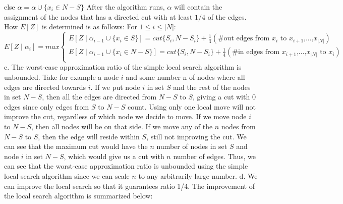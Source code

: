 \documentclass[oneside]{homework} %
\begin{document}
\quad \quad else $\alpha = \alpha \cup \{x_i \in N-S\}$ \newline
\newline
After the algorithm runs, $\alpha$ will contain the assignment of the nodes that has a directed cut with at least $1/4$ of the edges. How $E[Z]$ is determined is as follows: \newline
For $1 \leq i \leq |N|$:
\begin{equation*}
  E[Z \mid \alpha_i] = max
  \begin{cases}
    E[Z \mid \alpha_{i-1} \cup \{x_i \in S\}] = cut\{S_i, N-S_i\} + \frac{1}{4}(\#\text{out edges from $x_i$ to $x_{i+1}$,...,$x_{|N|}$}) \\
    E[Z \mid \alpha_{i-1} \cup \{x_i \in N-S\}] = cut\{S_i, N-S_i\} + \frac{1}{4}(\#\text{in edges from $x_{i+1}$,...,$x_{|N|}$ to $x_i$})\\
  \end{cases}
\end{equation*}
\newline
\newline
{\large c.} The worst-case approximation ratio of the simple local search algorithm is unbounded. Take for example a node $i$ and some number n of nodes where all edges are directed towards $i$. If we put node $i$ in set $S$ and the rest of the nodes in set $N-S$, then all the edges are directed from $N-S$ to $S$, giving a cut with 0 edges since only edges from $S$ to $N-S$ count. Using only one local move will not improve the cut, regardless of which node we decide to move. If we move node $i$ to $N-S$, then all nodes will be on that side. If we move any of the $n$ nodes from $N-S$ to $S$, then the edge will reside within $S$, still not improving the cut. We can see that the maximum cut would have the $n$ number of nodes in set $S$ and node $i$ in set $N-S$, which would give us a cut with $n$ number of edges. Thus, we can see that the worst-case approximation ratio is unbounded using the simple local search algorithm since we can scale $n$ to any arbitrarily large number.
\newline
\newline
{\large d.} We can improve the local search so that it guarantees ratio 1/4. The improvement of the local search algorithm is summarized below:
\newline
\newline
\end{document}
